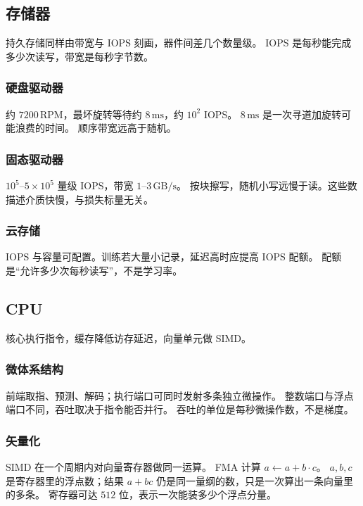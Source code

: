 \subsection{存储器}

持久存储同样由带宽与 IOPS 刻画，器件间差几个数量级。
IOPS 是每秒能完成多少次读写，带宽是每秒字节数。

\subsubsection{硬盘驱动器}

约 $7200\,\mathrm{RPM}$，最坏旋转等待约 $8\,\mathrm{ms}$，约 $10^2$ IOPS。
$8\,\mathrm{ms}$ 是一次寻道加旋转可能浪费的时间。
顺序带宽远高于随机。

\subsubsection{固态驱动器}

$10^5$–$5\times 10^5$ 量级 IOPS，带宽 $1$–$3\,\mathrm{GB/s}$。
按块擦写，随机小写远慢于读。这些数描述介质快慢，与损失标量无关。

\subsubsection{云存储}

IOPS 与容量可配置。训练若大量小记录，延迟高时应提高 IOPS 配额。
配额是“允许多少次每秒读写”，不是学习率。

\subsection{CPU}

核心执行指令，缓存降低访存延迟，向量单元做 SIMD。

\subsubsection{微体系结构}

前端取指、预测、解码；执行端口可同时发射多条独立微操作。
整数端口与浮点端口不同，吞吐取决于指令能否并行。
吞吐的单位是每秒微操作数，不是梯度。

\subsubsection{矢量化}

SIMD 在一个周期内对向量寄存器做同一运算。
FMA 计算 $a\leftarrow a+b\cdot c$。
$a,b,c$ 是寄存器里的浮点数；结果 $a+bc$ 仍是同一量纲的数，只是一次算出一条向量里的多条。
寄存器可达 $512$ 位，表示一次能装多少个浮点分量。

